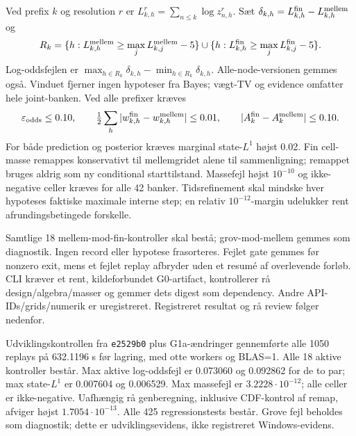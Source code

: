 Ved prefix \(k\) og resolution \(r\) er \(L_{k,h}^{r}=\sum_{n\le k}\log z_{n,h}^{r}\).
Sæt \(\delta_{k,h}=L_{k,h}^{\rm fin}-L_{k,h}^{\rm mellem}\) og
\[
 R_k=\{h:L_{k,h}^{\rm mellem}\ge\max_j L_{k,j}^{\rm mellem}-5\}
 \cup\{h:L_{k,h}^{\rm fin}\ge\max_j L_{k,j}^{\rm fin}-5\}.
\]
Log-oddsfejlen er \(\max_{h\in R_k}\delta_{k,h}-\min_{h\in R_k}\delta_{k,h}\).
Alle-node-versionen gemmes også. Vinduet fjerner ingen hypoteser fra Bayes;
vægt-TV og evidence omfatter hele joint-banken. Ved alle prefixer kræves
\[
 \varepsilon_{\rm odds}\le0.10,\qquad
 \tfrac12\sum_h|w_{k,h}^{\rm fin}-w_{k,h}^{\rm mellem}|\le0.01,\qquad
 |A_k^{\rm fin}-A_k^{\rm mellem}|\le0.10.
\]
For både prediction og posterior kræves marginal state-\(L^1\) højst 0.02.
Fin cell-masse remappes konservativt til mellemgridet alene til sammenligning;
remappet bruges aldrig som ny conditional starttilstand. Massefejl højst
\(10^{-10}\) og ikke-negative celler kræves for alle 42 banker. Tidsrefinement
skal mindske hver hypoteses faktiske maximale interne step; en relativ
\(10^{-12}\)-margin udelukker rent afrundingsbetingede forskelle.

Samtlige 18 mellem-mod-fin-kontroller skal bestå; grov-mod-mellem gemmes som
diagnostik. Ingen record eller hypotese frasorteres. Fejlet gate gemmes før
nonzero exit, mens et fejlet replay afbryder uden et resumé af overlevende forløb.
CLI kræver et rent, kildeforbundet G0-artifact, kontrollerer rå design/algebra/masser
og gemmer dets digest som dependency. Andre API-IDs/grids/numerik er uregistreret.
Registreret resultat og rå review følger nedenfor.

Udviklingskontrollen fra \texttt{e2529b0} plus G1a-ændringer gennemførte alle
1050 replays på 632.1196 s før lagring, med otte workers og BLAS=1.
Alle 18 aktive kontroller består. Max aktive log-oddsfejl er 0.073060 og
0.092862 for de to par; max state-\(L^1\) er 0.007604 og 0.006529.
Max massefejl er \(3.2228\cdot10^{-12}\); alle celler er ikke-negative.
Uafhængig rå genberegning, inklusive CDF-kontrol af remap, afviger højst
\(1.7054\cdot10^{-13}\). Alle 425 regressionstests består. Grove fejl beholdes
som diagnostik; dette er udviklingsevidens, ikke registreret Windows-evidens.

